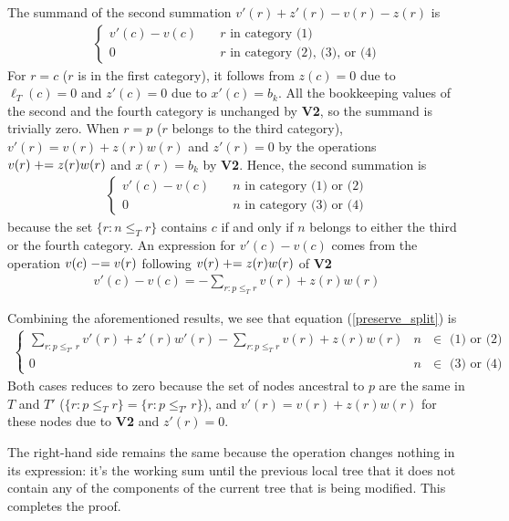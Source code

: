 The summand of the second summation $v'(r) + z'(r) - v(r) - z(r)$ is
\begin{align}
    \begin{cases}
    v'(c) - v(c) & \quad \text{$r$ in category (1)} \\
    0 & \quad  \text{$r$ in category (2), (3), or (4)}
    \end{cases} 
\end{align}
For $r=c$ ($r$ is in the first category), it follows from $z(c)=0$ due to $\ell_T(c)=0$ and $z'(c)=0$ due to $x'(c)=b_k$.
All the bookkeeping values of the second and the fourth category is unchanged by \textbf{V2}, so the summand is trivially zero.
When $r=p$ ($r$ belongs to the third category), $v'(r) = v(r) + z(r)w(r)$  and $z'(r)=0$ by the operations $v(r) \mathrel{+}= z(r)w(r)$ and $x(r)=b_k$ by \textbf{V2}.
Hence, the second summation is
\begin{align}
    \begin{cases}
        v'(c) - v(c) & \quad \text{$n$ in category (1) or (2)} \\
        0 & \quad \text{$n$ in category (3) or (4)}
    \end{cases}
\end{align}
because the set $\{r: n \le_T r\}$ contains $c$ if and only if $n$ belongs to either the third or the fourth category.
An expression for $v'(c)-v(c)$ comes from the operation $v(c) \mathrel{-}= v(r)$ following $v(r) \mathrel{+}= z(r)w(r)$ of \textbf{V2}
\begin{align}
    v'(c) - v(c) = - \sum_{r: p \le_{T} r} v(r) + z(r)w(r)
\end{align}

Combining the aforementioned results, we see that equation (\ref{preserve_split}) is 
\begin{align}
    \begin{cases}
        \sum_{r: p \le_{T'} r} v'(r) + z'(r)w'(r) - \sum_{r: p \le_{T} r} v(r) + z(r)w(r) & \text{$n$ $\in$ (1) or (2)} \\
        0 & \text{$n$ $\in$ (3) or (4)}
    \end{cases} 
\end{align}
Both cases reduces to zero because the set of nodes ancestral to $p$ are the same in $T$ and $T'$ ($\{r: p \le_T r\}=\{r: p \le_{T'} r\}$), 
 and $v'(r) = v(r) + z(r)w(r)$ for these nodes due to \textbf{V2} and $z'(r)=0$. 

The right-hand side remains the same because the operation changes nothing in its expression:
it's the working sum until the previous local tree that it does not contain any of 
the components of the current tree that is being modified.
This completes the proof.


